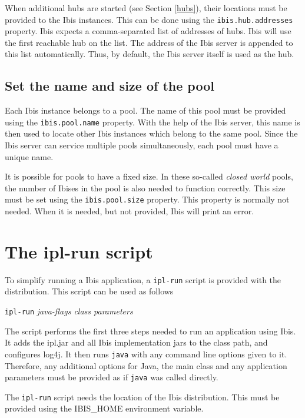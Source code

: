 \documentclass[a4paper,10pt]{article}
\begin{document}
When additional hubs are started (see Section \ref{hubs}), their locations 
must be provided to the Ibis instances. This can be done using 
the \texttt{ibis.hub.addresses} property. Ibis expects a comma-separated
list of addresses of hubs. Ibis will use the first reachable hub on the
list. The address of the Ibis server is appended to this list
automatically. Thus, by default, the Ibis server itself is used as the
hub.

\subsection{Set the name and size of the pool}

Each Ibis instance belongs to a pool. The name of this pool must be provided 
using the \texttt{ibis.pool.name} property. With the help of the Ibis server, 
this name is then used to locate other Ibis instances which belong to the
same pool. Since the Ibis server can service multiple pools simultaneously, 
each pool must have a unique name.

It is possible for pools to have a fixed size. In these so-called \emph{closed
world} pools, the number of Ibises in the pool is also needed to function 
correctly. This size must be set using the \texttt{ibis.pool.size} property. 
This property is normally not needed. When it is needed, but not provided, Ibis 
will print an error.

\section{The ipl-run script}

To simplify running a Ibis application, a \texttt{ipl-run} script is
provided with the distribution. This script can be
used as follows

\begin{center}
\texttt{ipl-run} \emph{java-flags class parameters}
\end{center}

The script performs the first three steps needed to run an application
using Ibis. It adds the ipl.jar and all Ibis implementation jars to the
class path, and configures log4j. It then runs \texttt{java} with any
command line options given to it. Therefore, any additional options for 
Java, the main class and any application parameters must be provided as 
if \texttt{java} was called directly.

The \texttt{ipl-run} script needs the location of the Ibis
distribution. This must be provided using the IBIS\_HOME environment
variable.
\end{document}
